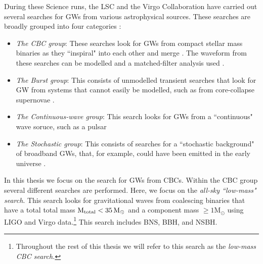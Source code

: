 During these Science runs, the \ac{LSC} and the Virgo Collaboration have
carried out several searches for \acp{GW} from various astrophysical sources.
These searches are broadly grouped into four categories \cite{Abbott:2007kv}:
\begin{itemize}

\item{{\it The \ac{CBC} group}: These searches look for \acp{GW} from compact
stellar mass binaries as they ``inspiral" into each other and merge
\cite{Belczynski:2002}. The waveform from these searches can be modelled and a
matched-filter analysis used \cite{Allen:2005fk}.}

\item{{\it The Burst group}: This consists of unmodelled transient searches
that look for \ac{GW} from systems that cannot easily be modelled, such as from
core-collapse supernovae \cite{Anderson:2000yy}.}

\item{{\it The Continuous-wave group}: This search looks for \acp{GW} from a
``continuous" wave soruce, such as a pulsar \cite{Collaboration:S5Pulsar}}

\item{{\it The Stochastic group}: This consists of searches for a ``stochastic
background" of broadband \acp{GW}, that, for example, could have been emitted
in the early universe \cite{Collaboration:S5stochastic}.}

\end{itemize} In this thesis we focus on the search for \acp{GW} from
\acp{CBC}. Within the \ac{CBC} group several different searches are performed.
Here, we focus on the \emph{all-sky ``low-mass" search}. This search looks for
gravitational waves from coalescing binaries that have a total total mass
$\mathrm{M_{total}} < 35\,\mathrm{M_\odot}$ and a component mass $\mathrm{\geq 1M_\odot}$ using LIGO
and Virgo data.\footnote{Throughout the rest of this thesis we will refer to
this search as the \emph{low-mass \ac{CBC} search.}} This search includes
\ac{BNS}, \ac{BBH}, and \ac{NSBH}.

